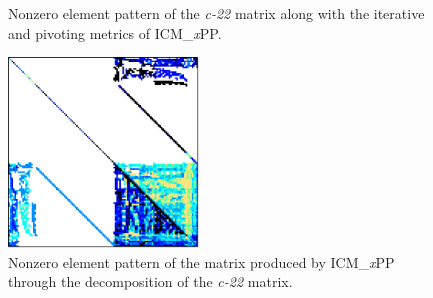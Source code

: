 \begin{figure}[ht!]
\begin{subfigure}[t]{0.51\textwidth}
		\label{Figure:comparing-decomposers-and-solvers->decomposition-project-benchmarks->decomposers-benchmark->comparison-of-execution-times-on-subset-of-matrices->matrix->c-22->icmxpp-metrics}
	\end{subfigure}
	\caption{Nonzero element pattern of the \textit{c-22} matrix along with the iterative and pivoting metrics of ICM\_\textit{x}PP.}
	\label{Figure:comparing-decomposers-and-solvers->decomposition-project-benchmarks->decomposers-benchmark->comparison-of-execution-times-on-subset-of-matrices->matrix->c-22}
\end{figure}

\begin{figure}[ht!]
	\centering
	\includegraphics[width=0.45\textwidth, keepaspectratio, clip]{images/ch03/input-matrices/decomposition-benchmarks/c-22_icmxpp.pdf}
	\caption{Nonzero element pattern of the  matrix produced by ICM\_\textit{x}PP through the decomposition of the \textit{c-22} matrix.}
	\label{Figure:comparing-decomposers-and-solvers->decomposition-project-benchmarks->decomposers-benchmark->comparison-of-execution-times-on-subset-of-matrices->matrix->c-22->icmxpp-LU-nonzero-element-pattern}
\end{figure}

